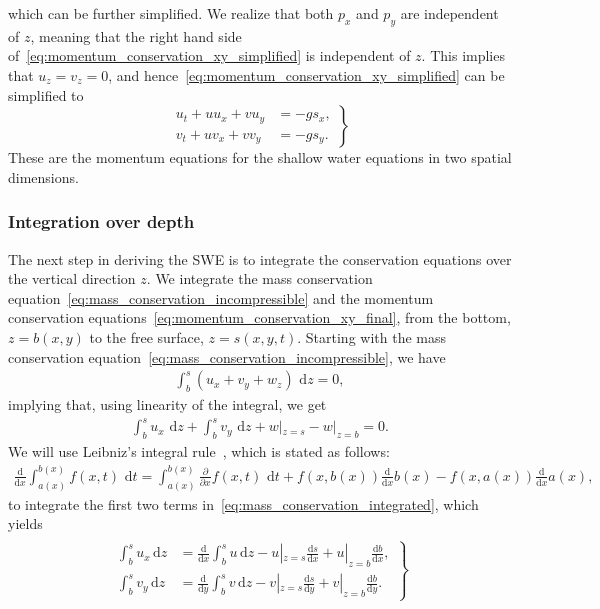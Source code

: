 which can be further simplified.
We realize that both $p_x$ and $p_y$ are independent of $z$, meaning that the right hand side of~\eqref{eq:momentum_conservation_xy_simplified} is independent of $z$.
This implies that $u_z = v_z = 0$, and hence~\eqref{eq:momentum_conservation_xy_simplified} can be simplified to
\begin{equation}\label{eq:momentum_conservation_xy_final}
    \left.
    \begin{aligned}
        u_t + u u_x + v u_y &= -g s_x,  \\
        v_t + u v_x + v v_y &= -g s_y.
    \end{aligned}
    \right\}
\end{equation}
These are the momentum equations for the shallow water equations in two spatial dimensions.

\subsubsection*{Integration over depth}
The next step in deriving the SWE is to integrate the conservation equations over the vertical direction $z$.
We integrate the mass conservation equation~\eqref{eq:mass_conservation_incompressible} and the momentum conservation equations~\eqref{eq:momentum_conservation_xy_final}, from the bottom, $z = b(x,y)$ to the free surface, $z = s(x,y,t)$.
Starting with the mass conservation equation~\eqref{eq:mass_conservation_incompressible}, we have
\begin{align*}
    \int_{b}^{s} \left( u_x + v_y + w_z \right) \text{ d} z = 0,
\end{align*}
implying that, using linearity of the integral, we get
\begin{align}\label{eq:mass_conservation_integrated}
    \int_{b}^{s} u_x \text{ d} z + \int_{b}^{s} v_y \text{ d} z  + w|_{z = s} - w|_{z = b} = 0.
\end{align}
We will use Leibniz's integral rule~\cite{Leibniz}, which is stated as follows:
\begin{align}\label{eq:leibniz_rule}
    \frac{\text{d}}{\text{d} x} \int_{a(x)}^{b(x)} f(x,t) \text{ d} t
    = \int_{a(x)}^{b(x)} \frac{\partial }{\partial x} f(x, t) \text{ d} t + f(x, b(x)) \frac{\text{d}}{\text{d} x} b(x) - f(x, a(x)) \frac{\text{d}}{\text{d} x} a(x),
\end{align}
to integrate the first two terms in~\eqref{eq:mass_conservation_integrated}, which yields
\begin{align}\label{eq:leibniz_rule_applied}
    \begin{gathered}
        \left.
        \begin{aligned}
        \int_{b}^{s} u_x \, \text{d} z &=  \frac{\text{d}}{\text{d} x}  \int_{b}^{s} u \, \text{d} z  - u|_{z = s} \frac{\text{d} s}{\text{d} x} + u|_{z = b} \frac{\text{d} b}{\text{d} x}, \\
        \int_{b}^{s} v_y \, \text{d} z &=  \frac{\text{d}}{\text{d} y}  \int_{b}^{s} v \, \text{d} z  - v|_{z = s} \frac{\text{d} s}{\text{d} y} + v|_{z = b} \frac{\text{d} b}{\text{d} y}.
        \end{aligned}
        \right\}
    \end{gathered}
\end{align}
